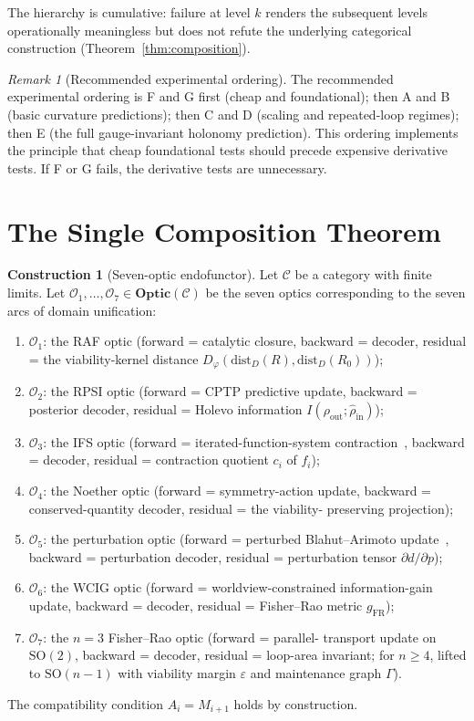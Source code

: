 \documentclass[11pt,a4paper]{article}
\theoremstyle{plain}
\theoremstyle{definition}
\newtheorem{construction}[theorem]{Construction}
\theoremstyle{remark}
\newtheorem{remark}[theorem]{Remark}
\newcommand{\OO}{\mathcal{O}}
\newcommand{\CC}{\mathcal{C}}
\newcommand{\SO}{\mathrm{SO}}
\newcommand{\Optic}{\mathbf{Optic}}
\begin{document}
The hierarchy is cumulative: failure at level $k$ renders the
subsequent levels operationally meaningless but does not refute the
underlying categorical construction (Theorem~\ref{thm:composition}).

\begin{remark}[Recommended experimental ordering]
\label{rem:ordering}
The recommended experimental ordering is F and G first (cheap and
foundational); then A and B (basic curvature predictions); then C and
D (scaling and repeated-loop regimes); then E (the full gauge-invariant
holonomy prediction). This ordering implements the principle that cheap
foundational tests should precede expensive derivative tests. If F or G
fails, the derivative tests are unnecessary.
\end{remark}

\section{The Single Composition Theorem}\label{sec:composition}

\begin{construction}[Seven-optic endofunctor]
\label{con:seven}
Let $\CC$ be a category with finite limits. Let $\OO_1,\ldots,\OO_7\in
\Optic(\CC)$ be the seven optics corresponding to the seven arcs of
domain unification:
\begin{enumerate}[leftmargin=*,itemsep=1pt]
\item $\OO_1$: the RAF optic (forward = catalytic closure, backward =
decoder, residual = the viability-kernel distance
$D_\varphi(\mathrm{dist}_D(R),\mathrm{dist}_D(R_0))$);
\item $\OO_2$: the RPSI optic (forward = CPTP predictive update,
backward = posterior decoder, residual = Holevo information
$I(\rho_{\mathrm{out}};\hat\rho_{\mathrm{in}})$);
\item $\OO_3$: the IFS optic (forward = iterated-function-system
contraction~\cite{hutchinson1981,barnsley1988}, backward = decoder,
residual = contraction quotient $c_i$ of $f_i$);
\item $\OO_4$: the Noether optic (forward = symmetry-action update,
backward = conserved-quantity decoder, residual = the viability-
preserving projection);
\item $\OO_5$: the perturbation optic (forward = perturbed
Blahut--Arimoto update~\cite{blahut1972,arimoto1972}, backward =
perturbation decoder, residual = perturbation tensor
$\partial d/\partial p$);
\item $\OO_6$: the WCIG optic (forward = worldview-constrained
information-gain update, backward = decoder, residual = Fisher--Rao
metric $g_{\mathrm{FR}}$);
\item $\OO_7$: the $n=3$ Fisher--Rao optic (forward = parallel-
transport update on $\SO(2)$, backward = decoder, residual = loop-area
invariant; for $n\geq 4$, lifted to $\SO(n-1)$ with viability margin
$\varepsilon$ and maintenance graph $\Gamma$).
\end{enumerate}
The compatibility condition $A_i = M_{i+1}$ holds by construction.
\end{construction}
\end{document}
